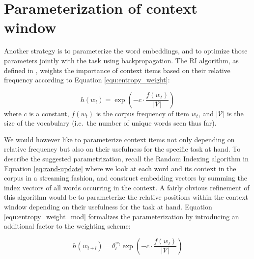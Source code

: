 \documentclass[11pt]{article}
\begin{document}
\section{Parameterization of context window}\label{sec:att_ri}

Another strategy is to parameterize the word embeddings, and to optimize those parameters jointly with the task using backpropagation. The RI algorithm, as defined in \cite{Sahlgren:2016}, weights the importance of context items based on their relative frequency according to Equation \eqref{equ:entropy_weight}:

\begin{equation}\label{equ:entropy_weight}
h(w_t) = \exp\left({-c\cdot\frac{f(w_t)}{|\mathcal{V}|}}\right)
\end{equation}
\noindent
where $c$ is a constant, $f(w_t)$ is the corpus frequency of item $w_t$, and $|\mathcal{V}|$ is the size of the vocabulary (i.e.~the number of unique words seen thus far).

We would however like to parameterize context items not only depending on relative frequency but also on their usefulness for the specific task at hand. To describe the suggested parametrization, recall the Random Indexing algorithm in Equation \eqref{eq:rand-update} where we look at each word and its context in the corpus in a streaming fashion, and construct embedding vectors by summing the index vectors of all words occurring in the context. A fairly obvious refinement of this algorithm would be to parameterize the relative positions within the context window depending on their usefulness for the task at hand. %
Equation \eqref{equ:entropy_weight_mod} formalizes the parameterization by introducing an additional factor to the weighting scheme:


\begin{equation}\label{equ:entropy_weight_mod}
h(w_{t+l}) = \theta_l^{w_t}\exp\left({-c\cdot\frac{f(w_t)}{|\mathcal{V}|}}\right)
\end{equation}
\end{document}
